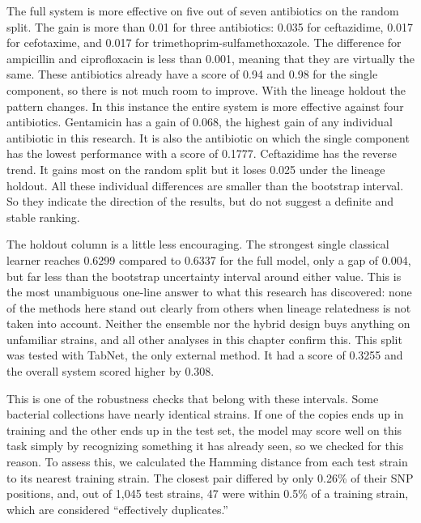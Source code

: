 The full system is more effective on five out of seven antibiotics on the random
split. The gain is more than 0.01 for three antibiotics: 0.035 for ceftazidime,
0.017 for cefotaxime, and 0.017 for trimethoprim-sulfamethoxazole. The difference
for ampicillin and ciprofloxacin is less than 0.001, meaning that they are
virtually the same. These antibiotics already have a score of 0.94 and 0.98 for
the single component, so there is not much room to improve. With the lineage
holdout the pattern changes. In this instance the entire system is more effective
against four antibiotics. Gentamicin has a gain of 0.068, the highest gain of any
individual antibiotic in this research. It is also the antibiotic on which the
single component has the lowest performance with a score of 0.1777. Ceftazidime
has the reverse trend. It gains most on the random split but it loses 0.025 under
the lineage holdout. All these individual differences are smaller than the
bootstrap interval. So they indicate the direction of the results, but do not
suggest a definite and stable ranking.

\vspace{1em}

The holdout column is a little less encouraging. The strongest single
classical learner reaches 0.6299 compared to 0.6337 for the full model, only a
gap of 0.004, but far less than the bootstrap uncertainty interval around
either value. This is the most unambiguous one-line answer to what this
research has discovered: none of the methods here stand out clearly from others
when lineage relatedness is not taken into account. Neither the ensemble nor
the hybrid design buys anything on unfamiliar strains, and all other analyses in
this chapter confirm this. This split was tested with TabNet, the only external
method. It had a score of 0.3255 and the overall system scored higher by 0.308.

This is one of the robustness checks that belong with these intervals. Some
bacterial collections have nearly identical strains. If one of the copies
ends up in training and the other ends up in the test set, the model may
score well on this task simply by recognizing something it has already seen,
so we checked for this reason. To assess this, we calculated the Hamming
distance from each test strain to its nearest training strain. The closest
pair differed by only 0.26\% of their SNP positions, and, out of 1{,}045 test
strains, 47 were within 0.5\% of a training strain, which are considered
``effectively duplicates.''

